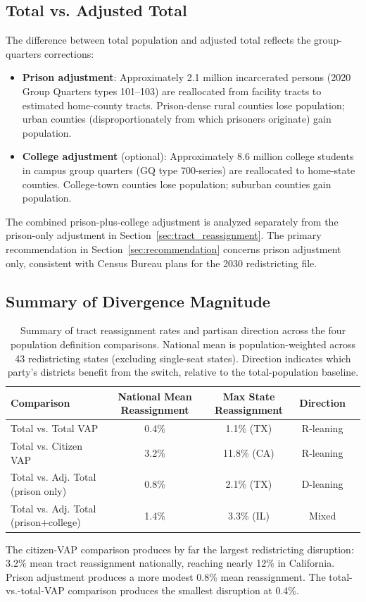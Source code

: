 \subsection{Total vs. Adjusted Total}

The difference between total population and adjusted total reflects the group-quarters corrections:
\begin{itemize}
    \item \textbf{Prison adjustment}: Approximately 2.1 million incarcerated persons (2020 Group Quarters types 101--103) are reallocated from facility tracts to estimated home-county tracts. Prison-dense rural counties lose population; urban counties (disproportionately from which prisoners originate) gain population.
    \item \textbf{College adjustment} (optional): Approximately 8.6 million college students in campus group quarters (GQ type 700-series) are reallocated to home-state counties. College-town counties lose population; suburban counties gain population.
\end{itemize}

The combined prison-plus-college adjustment is analyzed separately from the prison-only adjustment in Section~\ref{sec:tract_reassignment}. The primary recommendation in Section~\ref{sec:recommendation} concerns prison adjustment only, consistent with Census Bureau plans for the 2030 redistricting file.

\subsection{Summary of Divergence Magnitude}

\begin{table}[htbp]
\centering
\begin{tabular}{lcccc}
\toprule
\textbf{Comparison} & \textbf{National Mean Reassignment} & \textbf{Max State Reassignment} & \textbf{Direction} \\
\midrule
Total vs. Total VAP & 0.4\% & 1.1\% (TX) & R-leaning \\
Total vs. Citizen VAP & 3.2\% & 11.8\% (CA) & R-leaning \\
Total vs. Adj. Total (prison only) & 0.8\% & 2.1\% (TX) & D-leaning \\
Total vs. Adj. Total (prison+college) & 1.4\% & 3.3\% (IL) & Mixed \\
\bottomrule
\end{tabular}
\caption{Summary of tract reassignment rates and partisan direction across the four population definition comparisons. National mean is population-weighted across 43 redistricting states (excluding single-seat states). Direction indicates which party's districts benefit from the switch, relative to the total-population baseline.}
\label{tab:divergence_summary}
\end{table}

The citizen-VAP comparison produces by far the largest redistricting disruption: 3.2\% mean tract reassignment nationally, reaching nearly 12\% in California. Prison adjustment produces a more modest 0.8\% mean reassignment. The total-vs.-total-VAP comparison produces the smallest disruption at 0.4\%.
